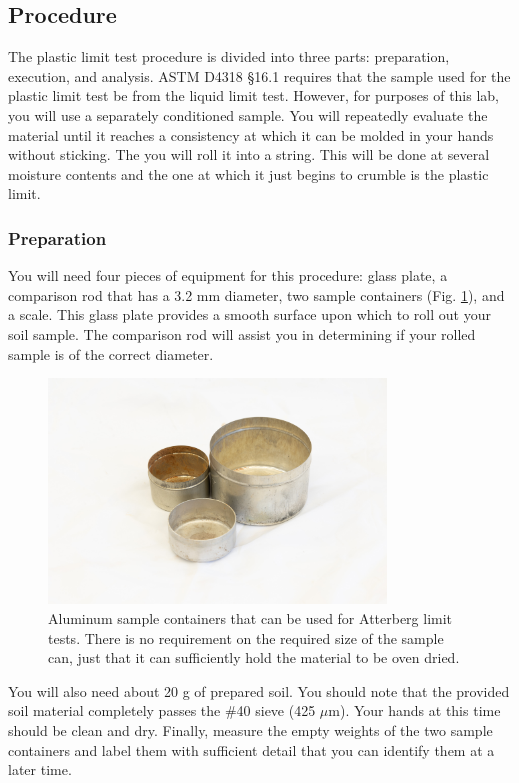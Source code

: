 \documentclass[12pt]{article}
\begin{document}
\pagebreak
\subsection{Procedure}
The plastic limit test procedure is divided into three parts: preparation, execution, and analysis. ASTM D4318 \S16.1 requires that the sample used for the plastic limit test be from the liquid limit test. However, for purposes of this lab, you will use a separately conditioned sample. You will repeatedly evaluate the material until it reaches a consistency at which it can be molded in your hands without sticking. The you will roll it into a string. This will be done at several moisture contents and the one at which it just begins to crumble is the plastic limit.

\subsubsection{Preparation}
You will need four pieces of equipment for this procedure: glass plate, a comparison rod that has a 3.2 mm diameter, two sample containers (Fig. \ref{fig:samplecontainer}), and a scale. This glass plate provides a smooth surface upon which to roll out your soil sample. The comparison rod will assist you in determining if your rolled sample is of the correct diameter.

\begin{figure}[H]
    \centering
    \includegraphics[width=0.8\textwidth]{GEO_5749.jpg}
    \caption{Aluminum sample containers that can be used for Atterberg limit tests. There is no requirement on the required size of the sample can, just that it can sufficiently hold the material to be oven dried.}
    \label{fig:samplecontainer}
\end{figure}

You will also need about 20 g of prepared soil. You should note that the provided soil material completely passes the \#40 sieve (425 $\mu$m). Your hands at this time should be clean and dry. Finally, measure the empty weights of the two sample containers and label them with sufficient detail that you can identify them at a later time.
\end{document}
